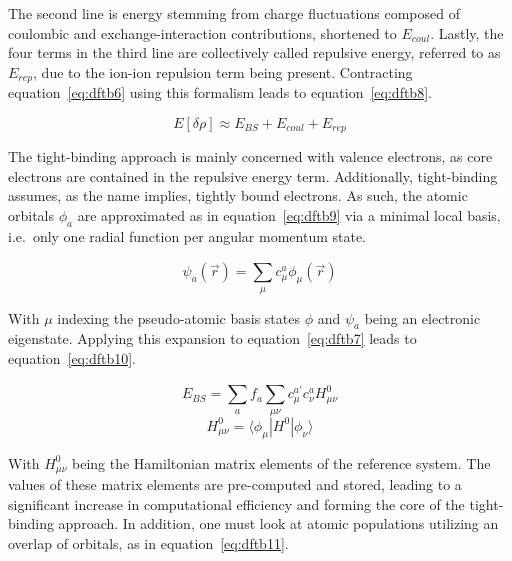 \documentclass[12pt]{article}
\begin{document}
\noindent The second line is energy stemming from charge fluctuations composed of coulombic and exchange-interaction contributions, shortened to $E_{coul}$. 
Lastly, the four terms in the third line are collectively called repulsive energy, referred to as $E_{rep}$, due to the ion-ion repulsion term being present.
Contracting equation~\ref{eq:dftb6} using this formalism leads to equation~\ref{eq:dftb8}.

\begin{equation}
  E[\delta\rho] \approx E_{BS} + E_{coul} + E_{rep}
  \label{eq:dftb8}
\end{equation}

\bigskip

\noindent The tight-binding approach is mainly concerned with valence electrons, as core electrons are contained in the repulsive energy term.
Additionally, tight-binding assumes, as the name implies, tightly bound electrons.
As such, the atomic orbitals $\phi_a$ are approximated as in equation~\ref{eq:dftb9} via a minimal local basis, i.e.~only one radial function per angular momentum state.

\begin{equation}
  \psi_a(\vec{r}) = \sum_{\mu}^{}c_{\mu}^a\phi_{\mu}(\vec{r})
  \label{eq:dftb9}
\end{equation}

\bigskip

\noindent With $\mu$ indexing the pseudo-atomic basis states $\phi$ and $\psi_a$ being an electronic eigenstate.
Applying this expansion to equation~\ref{eq:dftb7} leads to equation~\ref{eq:dftb10}.

\begin{equation}
  E_{BS} = \sum_{a}^{} f_a \sum_{\mu\nu}^{}c_{\mu}^{a'} c_{\nu}^a H_{\mu\nu}^0
  \label{eq:dftb10}
\end{equation}
\begin{equation*}
  H^0_{\mu\nu} = \langle\phi_{\mu}|H^0|\phi_{\nu}\rangle
\end{equation*}

\bigskip

\noindent With $H^0_{\mu\nu}$ being the Hamiltonian matrix elements of the reference system.
The values of these matrix elements are pre-computed and stored, leading to a significant increase in computational efficiency and forming the core of the tight-binding approach.
In addition, one must look at atomic populations utilizing an overlap of orbitals, as in equation~\ref{eq:dftb11}.
\end{document}
